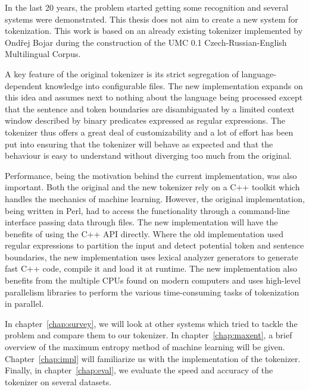 In the last 20 years, the problem started getting some recognition and several
systems were demonstrated. This thesis does not aim to create a new system for
tokenization. This work is based on an already existing tokenizer implemented
by Ondřej Bojar during the construction of the UMC 0.1 Czech-Russian-English
Multilingual Corpus.

A key feature of the original tokenizer is its strict segregation of
language-dependent knowledge into configurable files. The new implementation
expands on this idea and assumes next to nothing about the language being
processed except that the sentence and token boundaries are disambiguated by a
limited context window described by binary predicates expressed as regular
expressions. The tokenizer thus offers a great deal of customizability and a
lot of effort has been put into ensuring that the tokenizer will behave as
expected and that the behaviour is easy to understand without diverging too
much from the original.

Performance, being the motivation behind the current implementation, was also
important. Both the original and the new tokenizer rely on a C++ toolkit which
handles the mechanics of machine learning. However, the original
implementation, being written in Perl, had to access the functionality through
a command-line interface passing data through files. The new implementation
will have the benefits of using the C++ API directly. Where the old
implementation used regular expressions to partition the input and detect
potential token and sentence boundaries, the new implementation uses lexical
analyzer generators to generate fast C++ code, compile it and load it at
runtime. The new implementation also benefits from the multiple CPUs found on
modern computers and uses high-level parallelism libraries to perform the
various time-consuming tasks of tokenization in parallel.

In chapter~\ref{chap:survey}, we will look at other systems which tried to
tackle the problem and compare them to our tokenizer. In
chapter~\ref{chap:maxent}, a brief overview of the maximum entropy method of
machine learning will be given. Chapter~\ref{chap:impl} will familiarize us
with the implementation of the tokenizer. Finally, in chapter~\ref{chap:eval},
we evaluate the speed and accuracy of the tokenizer on several datasets.
